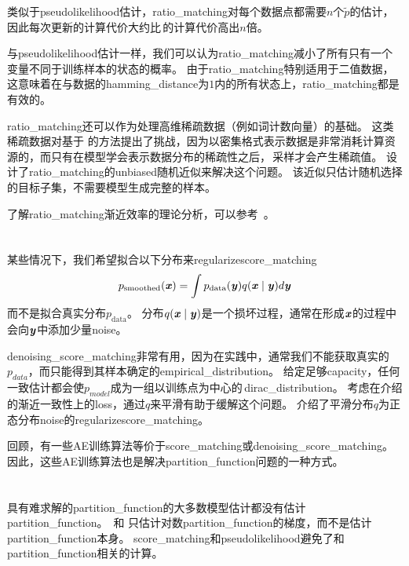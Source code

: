 
类似于\gls{pseudolikelihood}估计，\gls{ratio_matching}对每个数据点都需要$n$个$\tilde{p}$的估计，因此每次更新的计算代价大约比\,的计算代价高出$n$倍。


与\gls{pseudolikelihood}估计一样，我们可以认为\gls{ratio_matching}减小了所有只有一个变量不同于训练样本的状态的概率。
由于\gls{ratio_matching}特别适用于二值数据，这意味着在与数据的\gls{hamming_distance}为$1$内的所有状态上，\gls{ratio_matching}都是有效的。


\gls{ratio_matching}还可以作为处理高维稀疏数据（例如词计数向量）的基础。
这类稀疏数据对基于\,\,的方法提出了挑战，因为以密集格式表示数据是非常消耗计算资源的，而只有在模型学会表示数据分布的稀疏性之后，\,采样才会产生稀疏值。
\cite{Dauphin+Bengio-NIPS2013}设计了\gls{ratio_matching}的\gls{unbiased}随机近似来解决这个问题。
该近似只估计随机选择的目标子集，不需要模型生成完整的样本。


了解\gls{ratio_matching}渐近效率的理论分析，可以参考~\cite{Marlin11-small}。

\section{}
\label{sec:denoising_score_matching}
某些情况下，我们希望拟合以下分布来\gls{regularize}\gls{score_matching}
\begin{equation}
	p_{\text{smoothed}}(\boldsymbol{\mathit{x}}) = \int p_{\text{data}} (\boldsymbol{\mathit{y}}) q( \boldsymbol{\mathit{x}} \mid \boldsymbol{\mathit{y}}) d \boldsymbol{\mathit{y}}
\end{equation}
而不是拟合真实分布$p_{\text{data}}$。
分布$q(\boldsymbol{\mathit{x}} \mid \boldsymbol{\mathit{y}})$是一个损坏过程，通常在形成$\boldsymbol{\mathit{x}}$的过程中会向$\boldsymbol{\mathit{y}}$中添加少量\gls{noise}。


\gls{denoising_score_matching}非常有用，因为在实践中，通常我们不能获取真实的$p_{data}$，而只能得到其样本确定的\gls{empirical_distribution}。
给定足够\gls{capacity}，任何一致估计都会使$p_{model}$成为一组以训练点为中心的\,\gls{dirac_distribution}。
考虑在介绍的渐近一致性上的\gls{loss}，通过$q$来平滑有助于缓解这个问题。
\cite{Kingma+LeCun-2010}介绍了平滑分布$q$为正态分布\gls{noise}的\gls{regularize}\gls{score_matching}。


回顾，有一些\gls{AE}训练算法等价于\gls{score_matching}或\gls{denoising_score_matching}。
因此，这些\gls{AE}训练算法也是解决\gls{partition_function}问题的一种方式。


\section{}
\label{sec:noise_contrastive_estimation}
具有难求解的\gls{partition_function}的大多数模型估计都没有估计\gls{partition_function}。
\,和\,\,只估计对数\gls{partition_function}的梯度，而不是估计\gls{partition_function}本身。
\gls{score_matching}和\gls{pseudolikelihood}避免了和\gls{partition_function}相关的计算。 


